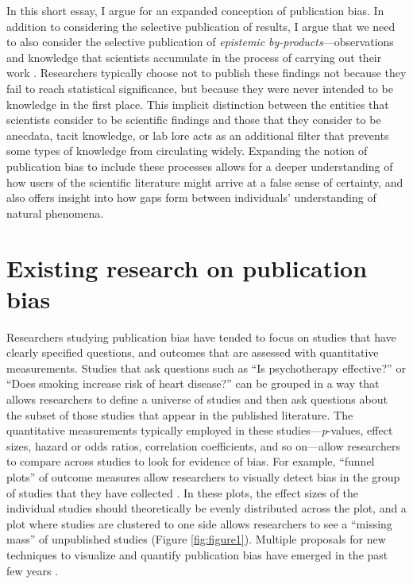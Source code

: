 \documentclass[twocolumn, serif, meta, authordate]{jote-article}
\begin{document}
In this short essay, I argue for an expanded conception of publication bias. In addition to considering the selective publication of results, I argue that we need to also consider the selective publication of \emph{epistemic by-products}—observations and knowledge that scientists accumulate in the process of carrying out their work \parencite{Nelson2018}. Researchers typically choose not to publish these findings not because they fail to reach statistical significance, but because they were never intended to be knowledge in the first place. This implicit distinction between the entities that scientists consider to be scientific findings and those that they consider to be anecdata, tacit knowledge, or lab lore acts as an additional filter that prevents some types of knowledge from circulating widely. Expanding the notion of publication bias to include these processes allows for a deeper understanding of how users of the scientific literature might arrive at a false sense of certainty, and also offers insight into how gaps form between individuals' understanding of natural phenomena.

 {} \section*{Existing research on publication bias}

Researchers studying publication bias have tended to focus on studies that have clearly specified questions, and outcomes that are assessed with quantitative measurements. Studies that ask questions such as ``Is psychotherapy effective?'' or ``Does smoking increase risk of heart disease?'' can be grouped in a way that allows researchers to define a universe of studies and then ask questions about the subset of those studies that appear in the published literature. The quantitative measurements typically employed in these studies---\emph{p}-values, effect sizes, hazard or odds ratios, correlation coefficients, and so on---allow researchers to compare across studies to look for evidence of bias. For example, ``funnel plots'' of outcome measures allow researchers to visually detect bias in the group of studies that they have collected \parencite{Begg1994, Egger1997}. In these plots, the effect sizes of the individual studies should theoretically be evenly distributed across the plot, and a plot where studies are clustered to one side allows researchers to see a ``missing mass'' of unpublished studies (Figure \ref{fig:figure1}). Multiple proposals for new techniques to visualize and quantify publication bias have emerged in the past few years \parencite{Schimmack2020, Simonsohn2013, vanAssen2015}.
\end{document}
